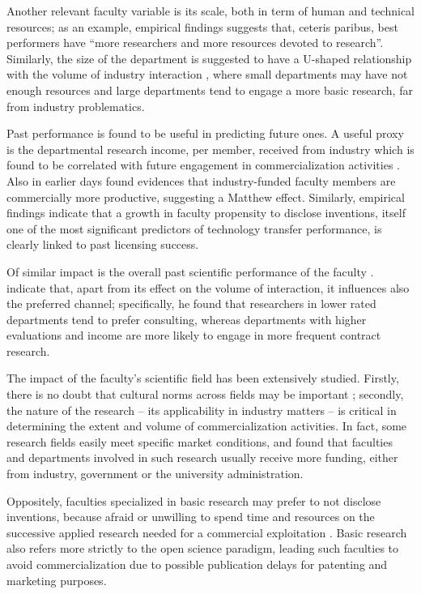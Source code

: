 Another relevant faculty variable is its scale, both in term of human and technical resources; as an example, \citet{OwenSmith2001} empirical findings suggests that, ceteris paribus, best performers have \enquote{more researchers and more resources devoted to research}. Similarly, the size of the department is suggested to have a U-shaped relationship with the volume of industry interaction \citep{DEste2007}, where small departments may have not enough resources and large departments tend to engage a more basic research, far from industry problematics.

Past performance is found to be useful in predicting future ones. A useful proxy is the departmental research income, per member, received from industry which is found to be correlated with future engagement in commercialization activities \citep{DEste2007}. Also \citet{Blumenthal1996} in earlier days found evidences that industry-funded faculty members are commercially more productive, suggesting a Matthew effect. Similarly, \citet{Thursby2002} empirical findings indicate that a growth in faculty propensity to disclose inventions, itself one of the most significant predictors of technology transfer performance, is clearly linked to past licensing success. 

Of similar impact is the overall past scientific performance of the faculty \citep{OShea2005}. \citep{DEste2011} indicate that, apart from its effect on the volume of interaction, it influences also the preferred channel; specifically, he found that researchers in lower rated departments tend to prefer consulting, whereas departments with higher evaluations and income are more likely to engage in more frequent contract research.

The impact of the faculty's scientific field has been extensively studied. Firstly, there is no doubt that cultural norms across fields may be important \citep{DEste2007}; secondly, the nature of the research – its applicability in industry matters – is critical in determining the extent and volume of commercialization activities. In fact, some research fields easily meet specific market conditions, and \citet{OShea2005} found that faculties and departments involved in such research usually receive more funding, either from industry, government or the university administration.

Oppositely, faculties specialized in basic research may prefer to not disclose inventions, because afraid or unwilling to spend time and resources on the successive applied research needed for a commercial exploitation \citep{Bercovitz2006}. Basic research also refers more strictly to the open science paradigm, leading such faculties to avoid commercialization due to possible publication delays for patenting and marketing purposes. 

